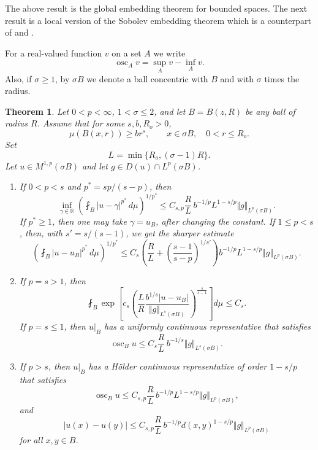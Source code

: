 \documentclass[12pt,leqno]{amsart}
\newtheorem{theorem}{Theorem}
\theoremstyle{definition}
\newcommand{\bbbr}{\mathbb R}
\numberwithin{theorem}{section} \numberwithin{equation}{section}
\begin{document}
The above result is the global embedding theorem for bounded spaces. The next result is a local version of the Sobolev embedding theorem which is a counterpart of \cite[Theorem~8.7]{hajlasz} and \cite[Theorem~6]{AGH}. 

For a real-valued function $v$ on a set $A$ we write
\[
 \operatorname{osc}_A v=\sup_Av-\inf_Av.
\]
Also, if $\sigma\geq 1$, by $\sigma B$ we denote a ball concentric with $B$ and with $\sigma$ times the radius.
\begin{theorem}
\label{T2}
Let $0<p<\infty$, $1<\sigma\leq2$, and let $B=B(z,R)$ be any ball of radius $R$. Assume that for some $s,b,R_o>0$,
\begin{equation}
\label{eq20}
 \mu(B(x,r))\geq br^s,
 \qquad x\in\sigma B,\quad 0<r\leq R_o.
\end{equation}
Set
\[
 L=\min\{R_o,(\sigma-1)R\}.
\]
Let $u\in M^{1,p}(\sigma B)$ and let $g\in D(u)\cap L^p(\sigma B)$.
\begin{enumerate}
\item If $0<p<s$ and $p^*=sp/(s-p)$, then
\[
 \inf_{\gamma\in\bbbr}
 \left(\fint_B|u-\gamma|^{p^*}\,d\mu\right)^{1/p^*}
 \leq C_{s,p}\frac{R}{L}\,b^{-1/p}L^{1-s/p}
 \Vert g\Vert_{L^p(\sigma B)}.
\]
If $p^*\geq1$, then one may take $\gamma=u_B$, after changing the constant. If $1\leq p<s$, then, with $s'=s/(s-1)$, we get the sharper estimate
\begin{equation}
\label{eq54}
 \left(\fint_B|u-u_B|^{p^*}\,d\mu\right)^{1/p^*}
 \leq C_s\left(
 \frac{R}{L}+\left(\frac{s-1}{s-p}\right)^{1/s'}
 \right)b^{-1/p}L^{1-s/p}
 \Vert g\Vert_{L^p(\sigma B)}.
\end{equation}

\item If $p=s>1$, then
\[
 \fint_B
 \exp\!\left[
 c_s\left(
 \frac{L}{R}\frac{b^{1/s}|u-u_B|}
 {\Vert g\Vert_{L^s(\sigma B)}}
 \right)^{\frac{s}{s-1}}
 \right]d\mu
 \leq C_s.
\]
If $p=s\leq1$, then $u|_B$ has a  uniformly continuous representative that satisfies
\begin{equation}
\label{eq osc}
 \operatorname{osc}_B u
 \leq C_s\frac{R}{L}\,b^{-1/s}
 \Vert g\Vert_{L^s(\sigma B)}.
\end{equation}

\item If $p>s$, then $u|_B$ has a H\"older continuous representative of order $1-s/p$ that satisfies
\[
 \operatorname{osc}_B u
 \leq C_{s,p}\frac{R}{L}\,b^{-1/p}L^{1-s/p}
 \Vert g\Vert_{L^p(\sigma B)},
\]
and
\[
 |u(x)-u(y)|
 \leq C_{s,p}\frac{R}{L}\,b^{-1/p}d(x,y)^{1-s/p}
 \Vert g\Vert_{L^p(\sigma B)}
\]
for all $x,y\in B$.
\end{enumerate}
\end{theorem}
\end{document}
